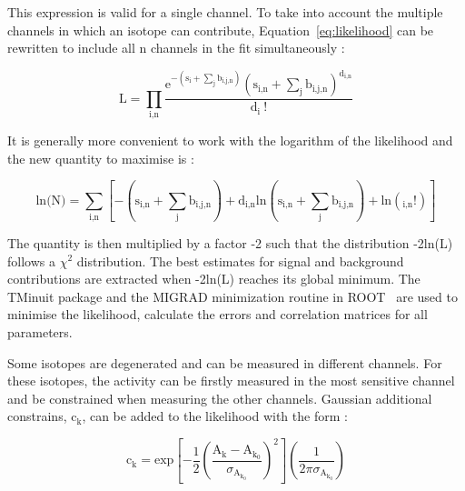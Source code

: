 \documentclass[main.tex]{subfiles}
\begin{document}
\bigskip


\NI This expression is valid for a single channel. To take into account the multiple channels in which an isotope can contribute, Equation~\ref{eq:likelihood} can be rewritten to include all n channels in the fit simultaneously : 


\begin{equation}
\text{L} = \prod_{\text{i,n}} \frac{\text{e}^{-(\text{s}_\text{i}+ \sum_\text{j} \text{b}_{\text{i,j,n}})} (\text{s}_{\text{i,n}} + \sum _\text{j} \text{b}_{\text{i,j,n}})^{\text{d}_{\text{i,n}}} } {\text{d}_\text{i}~\text{!}}
\end{equation}


\bigskip


\NI It is generally more convenient to work with the logarithm of the likelihood and the new quantity to maximise is :


\begin{equation}
\text{ln(N)} = \sum_{\text{i,n}} \left[ -(\text{s}_{\text{i,n}} + \sum_\text{j} \text{b}_{\text{i,j,n}}) + \text{d}_{\text{i,n}} \text{ln} \left( \text{s}_{\text{i,n}} + \sum_\text{j} \text{b}_{\text{i,j,n}}\right) + \text{ln}(\text{}_{\text{i,n}} \text{!})  \right]
\end{equation}


\bigskip


\NI The quantity is then multiplied by a factor -2 such that the distribution -2ln(L) follows a $\chi^\text{2}$ distribution. The best estimates for signal and background contributions are extracted when -2ln(L) reaches its global minimum. The TMinuit package and the MIGRAD minimization routine in ROOT~\cite{Root} are used to minimise the likelihood, calculate the errors and correlation matrices for all parameters.



\bigskip


\NI Some isotopes are degenerated and can be measured in different channels. For these isotopes, the activity can be firstly measured in the most sensitive channel and be constrained when measuring the other channels. Gaussian additional constrains, c$_\text{k}$, can be added to the likelihood with the form : 

\begin{equation}
\text{c}_\text{k} = \text{exp} \left[ -\frac{\text{1}}{\text{2}} \left( \frac{\text{A}_\text{k} - \text{A}_{\text{k}_\text{0}}}{\sigma_{\text{A}_{\text{k}_\text{0}}}} \right)^\text{2} \right] \left(  \frac{\text{1}}{\text{2}\pi \sigma_{\text{A}_{\text{k}_\text{0}}}} \right) 
\end{equation}
\end{document}
